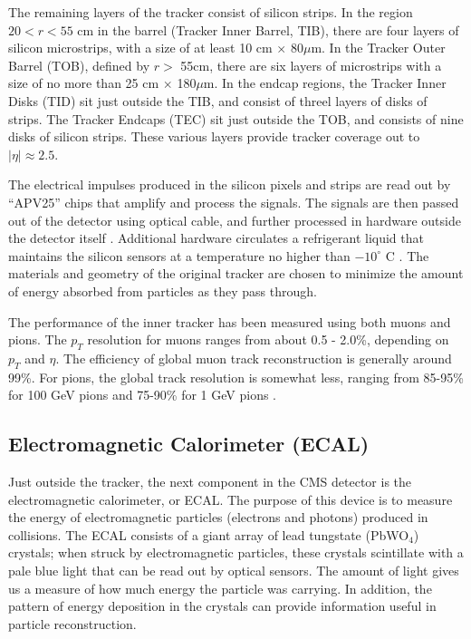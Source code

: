 The remaining layers of the tracker consist of silicon strips. In the
region $20 < r < 55$ cm in the barrel (Tracker Inner Barrel, TIB),
there are four layers of silicon
microstrips, with a size of at least 10 cm $\times$ 80$\mu$m. In the
Tracker Outer Barrel (TOB), defined by $r >$ 55cm, there are six
layers of microstrips with a size of no more than 25 cm $\times$
180$\mu$m. In the endcap regions, the Tracker Inner Disks (TID) sit
just outside the TIB, and consist of threel layers of disks of
strips. The Tracker Endcaps (TEC) sit just outside the TOB, and
consists of nine disks of silicon strips. These various layers provide
tracker coverage out to $|\eta| \approx 2.5$.

The electrical impulses produced in the silicon pixels and strips are
read out by ``APV25'' chips that amplify and process the signals. The
signals are then passed out of the detector using optical cable, and
further processed in hardware outside the detector itself
\cite{tdr}. Additional hardware circulates a refrigerant liquid that
maintains the silicon sensors at a temperature no higher than
$-10^\circ$ C \cite{accelexper}. The materials and geometry of the
original tracker are chosen to minimize the amount of energy absorbed
from particles as they pass through.

The performance of the inner tracker has been measured using both
muons and pions. The $p_T$ resolution for muons ranges from about 0.5
- 2.0\%, depending on $p_T$ and $\eta$. The efficiency of
global muon track reconstruction is generally around 99\%. For pions,
the global track resolution is somewhat less, ranging from 85-95\% for
100 GeV pions and 75-90\% for 1 GeV pions \cite{tdr}.

\subsection{Electromagnetic Calorimeter (ECAL)}
\label{ssec:cms:components:ecal}

Just outside the tracker, the next component in the CMS
detector is the electromagnetic calorimeter, or ECAL. The purpose of
this device is to measure the energy of electromagnetic particles
(electrons and photons) produced in collisions. The ECAL consists
of a giant array of lead tungstate (PbWO$_4$) crystals; when struck by
electromagnetic particles, these crystals scintillate with a
pale blue light that can be read out by optical sensors. The amount of
light gives us a measure of how much energy the particle was
carrying. In addition, the pattern of energy deposition in the
crystals can provide information useful in particle
reconstruction.

